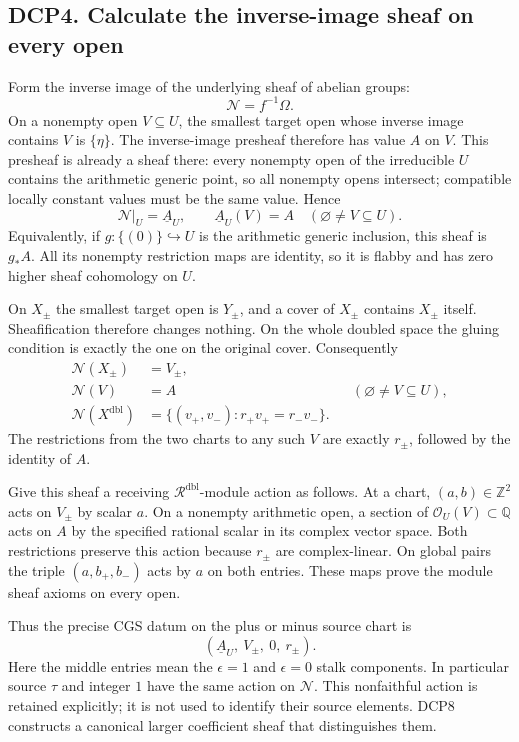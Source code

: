 \subsection{DCP4. Calculate the inverse-image sheaf on every
open}\label{dcp4.-calculate-the-inverse-image-sheaf-on-every-open}

Form the inverse image of the underlying sheaf of abelian groups: \[
 \mathcal N=f^{-1}\Omega.
\tag{DCP4.1}
\] On a nonempty open \(V\subseteq U\), the smallest target open whose
inverse image contains \(V\) is \(\{\eta\}\). The inverse-image presheaf
therefore has value \(A\) on \(V\). This presheaf is already a sheaf
there: every nonempty open of the irreducible \(U\) contains the
arithmetic generic point, so all nonempty opens intersect; compatible
locally constant values must be the same value. Hence \[
 \mathcal N|_U=\underline A_U,\qquad
 \underline A_U(V)=A\quad(\varnothing\ne V\subseteq U).
\tag{DCP4.2}
\] Equivalently, if \(g:\{(0)\}\hookrightarrow U\) is the arithmetic
generic inclusion, this sheaf is \(g_*A\). All its nonempty restriction
maps are identity, so it is flabby and has zero higher sheaf cohomology
on \(U\).

On \(X_\pm\) the smallest target open is \(Y_\pm\), and a cover of
\(X_\pm\) contains \(X_\pm\) itself. Sheafification therefore changes
nothing. On the whole doubled space the gluing condition is exactly the
one on the original cover. Consequently \[
\begin{aligned}
 \mathcal N(X_\pm)&=V_\pm,\\
 \mathcal N(V)&=A &&(\varnothing\ne V\subseteq U),\\
 \mathcal N(X^{\mathrm{dbl}})
 &=\{(v_+,v_-):r_+v_+=r_-v_-\}.
\end{aligned}
\tag{DCP4.3}
\] The restrictions from the two charts to any such \(V\) are exactly
\(r_\pm\), followed by the identity of \(A\).

Give this sheaf a receiving \(\mathcal R^{\mathrm{dbl}}\)-module action
as follows. At a chart, \((a,b)\in\mathbb Z^2\) acts on \(V_\pm\) by
scalar \(a\). On a nonempty arithmetic open, a section of
\(\mathcal O_U(V)\subset\mathbb Q\) acts on \(A\) by the specified
rational scalar in its complex vector space. Both restrictions preserve
this action because \(r_\pm\) are complex-linear. On global pairs the
triple \((a,b_+,b_-)\) acts by \(a\) on both entries. These maps prove
the module sheaf axioms on every open.

Thus the precise CGS datum on the plus or minus source chart is \[
 (\underline A_U,\ V_\pm,\ 0,\ r_\pm).
\tag{DCP4.4}
\] Here the middle entries mean the \(\epsilon=1\) and \(\epsilon=0\)
stalk components. In particular source \(\tau\) and integer \(1\) have
the same action on \(\mathcal N\). This nonfaithful action is retained
explicitly; it is not used to identify their source elements. DCP8
constructs a canonical larger coefficient sheaf that distinguishes them.

